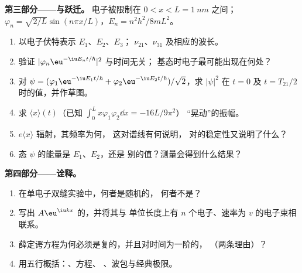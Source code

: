 \begin{problem}
\textbf{第三部分——与跃迁。}
电子被限制在 $0 < x < L = \qty{1}{nm}$ 之间；$\varphi_n =
\sqrt{2/L}\sin(n\pi x/L)$，$E_n = n^2h^2/8mL^2$。
\begin{enumerate}[resume]
  \item 以电子伏特表示 $E_1$、$E_2$、$E_3$；
        $\nu_{21}$、$\nu_{31}$ 及相应的波长。
  \item 验证 $|\varphi_n\eu^{-\iu E_nt/\hbar}|^2$ 与时间无关；
        基态时电子最可能出现在何处？
  \item 对 $\psi = (\varphi_1\eu^{-\iu E_1t/\hbar} + \varphi_2\eu^{-\iu E_2t/\hbar})/
        \sqrt2$，求 $|\psi|^2$ 在 $t = 0$ 及 $t = T_{21}/2$ 时的值，并作草图。
  \item 求 $\langle x\rangle(t)$（已知 $\int_0^Lx\varphi_1\varphi_2\dd x = -16L/9\pi^2$）
        “晃动”的振幅。
  \item {} $e\langle x\rangle$ 辐射，其频率为何，
        这对谱线有何说明，
        对的稳定性又说明了什么？
  \item 态 $\psi$ 的能量是 $E_1$、$E_2$，还是
        别的值？测量会得到什么结果？
\end{enumerate}

\textbf{第四部分——诠释。}
\begin{enumerate}[resume]
  \item 在单电子双缝实验中，何者是随机的，
        何者不是？
  \item 写出 $A\eu^{\iu kx}$ 的，并将其与
        单位长度上有 $n$ 个电子、速率为 $v$ 的电子束相联系。
  \item 薛定谔方程为何必须是复的，并且对时间为一阶的，
        （两条理由）？
  \item 用五行概括：、方程、
        、波包与经典极限。
\end{enumerate}
\end{problem}
